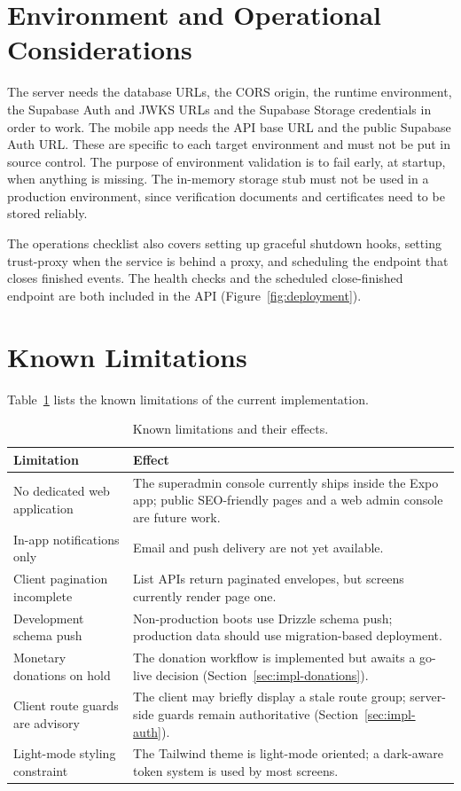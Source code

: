 \section{Environment and Operational Considerations}
The server needs the database URLs, the CORS origin, the runtime environment, the Supabase Auth and JWKS URLs and the Supabase Storage credentials in order to work. The mobile app needs the API base URL and the public Supabase Auth URL. These are specific to each target environment and must not be put in source control. The purpose of environment validation is to fail early, at startup, when anything is missing. The in-memory storage stub must not be used in a production environment, since verification documents and certificates need to be stored reliably.

The operations checklist also covers setting up graceful shutdown hooks, setting trust-proxy when the service is behind a proxy, and scheduling the endpoint that closes finished events. The health checks and the scheduled close-finished endpoint are both included in the API (Figure~\ref{fig:deployment}).

\section{Known Limitations}
\label{sec:limitations}
Table~\ref{tab:limitations} lists the known limitations of the current implementation.

\begin{table}[H]\centering
\caption{Known limitations and their effects.}
\label{tab:limitations}
\begin{tabularx}{\textwidth}{|p{}|X|}
\hline
\textbf{Limitation} & \textbf{Effect}\\\hline
No dedicated web application & The superadmin console currently ships inside the Expo app; public SEO-friendly pages and a web admin console are future work.\\\hline
In-app notifications only & Email and push delivery are not yet available.\\\hline
Client pagination incomplete & List APIs return paginated envelopes, but screens currently render page one.\\\hline
Development schema push & Non-production boots use Drizzle schema push; production data should use migration-based deployment.\\\hline
Monetary donations on hold & The donation workflow is implemented but awaits a go-live decision (Section~\ref{sec:impl-donations}).\\\hline
Client route guards are advisory & The client may briefly display a stale route group; server-side guards remain authoritative (Section~\ref{sec:impl-auth}).\\\hline
Light-mode styling constraint & The Tailwind theme is light-mode oriented; a dark-aware token system is used by most screens.\\\hline
\end{tabularx}
\end{table}

